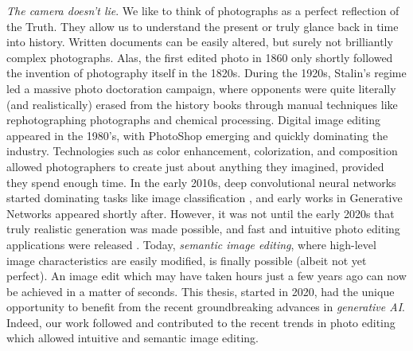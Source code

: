 \emph{The camera doesn't lie}. We like to think of photographs as a perfect 
reflection of the Truth. They allow us to understand the present or truly 
glance back in time into history. 
Written documents can be easily altered, but surely not brilliantly complex photographs. 
Alas, the first edited photo in 1860 only shortly followed 
 the invention of photography itself in the 1820s. 
 During the 1920s, Stalin's regime led a massive photo 
 doctoration campaign, where 
opponents were quite literally (and realistically) erased from the history
 books 
through manual techniques like 
rephotographing photographs and chemical processing.  Digital 
image 
editing appeared in the 1980's, with PhotoShop emerging and quickly dominating 
the industry. Technologies such as color enhancement, colorization, and composition 
allowed photographers to create just about anything they imagined, provided they 
spend enough time.  In the early 2010s, deep convolutional neural networks started dominating tasks like image classification ,
and early works in Generative Networks appeared shortly after. However, it was not until 
the early 2020s that truly realistic generation was made possible, and fast and intuitive 
photo editing applications were released . Today, \emph{semantic image editing}, 
where high-level image characteristics are easily modified, is finally possible (albeit not 
yet perfect). An 
image edit which may have taken hours just a few years ago can now be achieved in a matter of seconds. This thesis, started in 2020, had the unique opportunity to benefit from 
the recent groundbreaking advances in \emph{generative AI}. Indeed, our work
 followed and contributed to the recent trends in 
photo editing which allowed intuitive and semantic image editing. 




